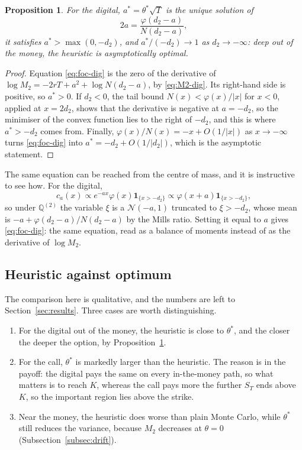 \documentclass[11pt,a4paper]{article}
\theoremstyle{plain}
\newtheorem{proposition}[theorem]{Proposition}
\theoremstyle{definition}
\theoremstyle{remark}
\newcommand{\Q}{\mathbb{Q}}
\newcommand{\1}{\mathbf{1}}
\begin{document}
\begin{proposition}\label{prop:digopt}
For the digital, $a^* = \theta^*\sqrt T$ is the unique solution of
\begin{equation}\label{eq:foc-dig}
  2a = \frac{\varphi(d_2 - a)}{N(d_2 - a)},
\end{equation}
it satisfies $a^* > \max(0, -d_2)$, and $a^*/(-d_2) \to 1$ as $d_2 \to -\infty$: deep out of the money, the heuristic is asymptotically optimal.
\end{proposition}

\begin{proof}
Equation \eqref{eq:foc-dig} is the zero of the derivative of $\log M_2 = -2rT + a^2 + \log N(d_2 - a)$, by \eqref{eq:M2-dig}. Its right-hand side is positive, so $a^* > 0$. If $d_2 < 0$, the tail bound $N(x) < \varphi(x)/|x|$ for $x < 0$, applied at $x = 2d_2$, shows that the derivative is negative at $a = -d_2$, so the minimiser of the convex function lies to the right of $-d_2$, and this is where $a^* > -d_2$ comes from. Finally, $\varphi(x)/N(x) = -x + O(1/|x|)$ as $x \to -\infty$ turns \eqref{eq:foc-dig} into $a^* = -d_2 + O(1/|d_2|)$, which is the asymptotic statement.
\end{proof}

The same equation can be reached from the centre of mass, and it is instructive to see how. For the digital,
\[
  c_a(x) \propto e^{-ax}\varphi(x)\1_{\{x > -d_2\}} \propto \varphi(x + a)\1_{\{x > -d_2\}},
\]
so under $\Q^{(2)}$ the variable $\xi$ is a $\mathcal N(-a, 1)$ truncated to $\xi > -d_2$, whose mean is $-a + \varphi(d_2 - a)/N(d_2 - a)$ by the Mills ratio. Setting it equal to $a$ gives \eqref{eq:foc-dig}: the same equation, read as a balance of moments instead of as the derivative of $\log M_2$.

\subsection{Heuristic against optimum}
\label{subsec:heur-opt}

The comparison here is qualitative, and the numbers are left to Section~\ref{sec:results}. Three cases are worth distinguishing.
\begin{enumerate}[label=(\roman*), leftmargin=2em, itemsep=1pt]
\item For the digital out of the money, the heuristic is close to $\theta^*$, and the closer the deeper the option, by Proposition~\ref{prop:digopt}.
\item For the call, $\theta^*$ is markedly larger than the heuristic. The reason is in the payoff: the digital pays the same on every in-the-money path, so what matters is to reach $K$, whereas the call pays more the further $S_T$ ends above $K$, so the important region lies above the strike.
\item Near the money, the heuristic does worse than plain Monte Carlo, while $\theta^*$ still reduces the variance, because $M_2$ decreases at $\theta = 0$ (Subsection~\ref{subsec:drift}).
\end{enumerate}
\end{document}
